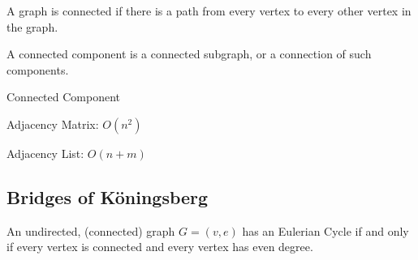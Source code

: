 \documentclass[english, 10pt]{article}
\begin{document}
    A graph is connected if there is a path from every vertex to every other vertex in the graph.

    A connected component is a connected subgraph, or a connection of such components.

\begin{algorithm}[H]

    \caption{Connected Component}
\end{algorithm}

Adjacency Matrix: $O(n^2)$

Adjacency List: $O(n+m)$

\subsection{Bridges of K{\"o}ningsberg}

\begin{thrm}
    An undirected, (connected) graph $G=(v,e)$ has an Eulerian Cycle if and only if every vertex is connected and every vertex has even degree.
\end{thrm}



\end{document}
